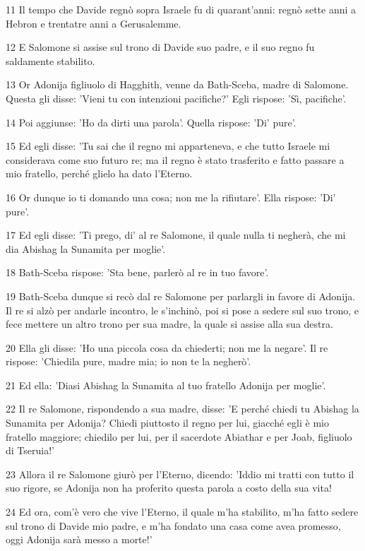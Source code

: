 \par 11 Il tempo che Davide regnò sopra Israele fu di quarant'anni: regnò sette anni a Hebron e trentatre anni a Gerusalemme.
\par 12 E Salomone si assise sul trono di Davide suo padre, e il suo regno fu saldamente stabilito.
\par 13 Or Adonija figliuolo di Hagghith, venne da Bath-Sceba, madre di Salomone. Questa gli disse: 'Vieni tu con intenzioni pacifiche?' Egli rispose: 'Sì, pacifiche'.
\par 14 Poi aggiunse: 'Ho da dirti una parola'. Quella rispose: 'Di' pure'.
\par 15 Ed egli disse: 'Tu sai che il regno mi apparteneva, e che tutto Israele mi considerava come suo futuro re; ma il regno è stato trasferito e fatto passare a mio fratello, perché glielo ha dato l'Eterno.
\par 16 Or dunque io ti domando una cosa; non me la rifiutare'. Ella rispose: 'Di' pure'.
\par 17 Ed egli disse: 'Ti prego, di' al re Salomone, il quale nulla ti negherà, che mi dia Abishag la Sunamita per moglie'.
\par 18 Bath-Sceba rispose: 'Sta bene, parlerò al re in tuo favore'.
\par 19 Bath-Sceba dunque si recò dal re Salomone per parlargli in favore di Adonija. Il re si alzò per andarle incontro, le s'inchinò, poi si pose a sedere sul suo trono, e fece mettere un altro trono per sua madre, la quale si assise alla sua destra.
\par 20 Ella gli disse: 'Ho una piccola cosa da chiederti; non me la negare'. Il re rispose: 'Chiedila pure, madre mia; io non te la negherò'.
\par 21 Ed ella: 'Diasi Abishag la Sunamita al tuo fratello Adonija per moglie'.
\par 22 Il re Salomone, rispondendo a sua madre, disse: 'E perché chiedi tu Abishag la Sunamita per Adonija? Chiedi piuttosto il regno per lui, giacché egli è mio fratello maggiore; chiedilo per lui, per il sacerdote Abiathar e per Joab, figliuolo di Tseruia!'
\par 23 Allora il re Salomone giurò per l'Eterno, dicendo: 'Iddio mi tratti con tutto il suo rigore, se Adonija non ha proferito questa parola a costo della sua vita!
\par 24 Ed ora, com'è vero che vive l'Eterno, il quale m'ha stabilito, m'ha fatto sedere sul trono di Davide mio padre, e m'ha fondato una casa come avea promesso, oggi Adonija sarà messo a morte!'
